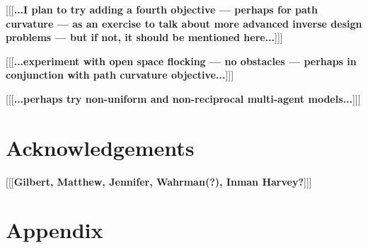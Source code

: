 \documentclass[letterpaper]{article}
\begin{document}
[[[\textbf{...I plan to try adding a fourth objective --- perhaps for path curvature --- as an exercise to talk about more advanced inverse design problems --- but if not, it should be mentioned here...}]]]

[[[\textbf{...experiment with open space flocking --- no obstacles --- perhaps in conjunction with path curvature objective...}]]]

[[[\textbf{...perhaps try non-uniform \citep{montanari_optimal_2025} and non-reciprocal \citep{choi_flocking_2025} multi-agent models...}]]]

\section{Acknowledgements}
\label{sec:ack}

[[[\textbf{Gilbert, Matthew, Jennifer, Wahrman(?), Inman Harvey?}]]]









\appendix
\onecolumn
\section{Appendix}
\label{sec:appendix}
\end{document}
